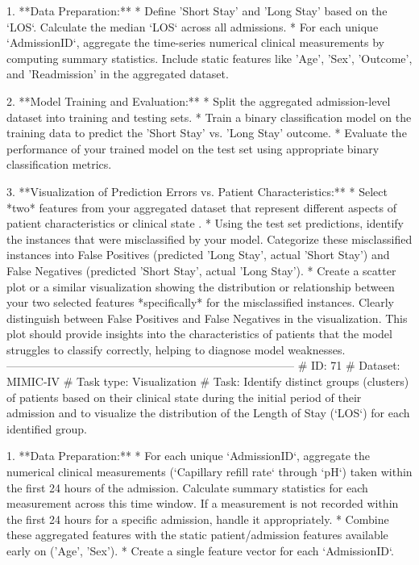 \begin{tcolorbox}[colback=cadmiumgreen!5!white,colframe=forestgreen!75!white,breakable,title=\textit{Generated analytical tasks in task 4.}]
\begin{VerbatimWrap}
 1. **Data Preparation:**
  * Define 'Short Stay' and 'Long Stay' based on the `LOS`. Calculate the median `LOS` across all admissions.
  * For each unique `AdmissionID`, aggregate the time-series numerical clinical measurements by computing summary statistics. Include static features like 'Age', 'Sex', 'Outcome', and 'Readmission' in the aggregated dataset.
 
 2. **Model Training and Evaluation:**
  * Split the aggregated admission-level dataset into training and testing sets.
  * Train a binary classification model on the training data to predict the 'Short Stay' vs. 'Long Stay' outcome.
  * Evaluate the performance of your trained model on the test set using appropriate binary classification metrics.
 
 3. **Visualization of Prediction Errors vs. Patient Characteristics:**
  * Select *two* features from your aggregated dataset that represent different aspects of patient characteristics or clinical state .
  * Using the test set predictions, identify the instances that were misclassified by your model. Categorize these misclassified instances into False Positives (predicted 'Long Stay', actual 'Short Stay') and False Negatives (predicted 'Short Stay', actual 'Long Stay').
  * Create a scatter plot or a similar visualization showing the distribution or relationship between your two selected features *specifically* for the misclassified instances. Clearly distinguish between False Positives and False Negatives in the visualization. This plot should provide insights into the characteristics of patients that the model struggles to classify correctly, helping to diagnose model weaknesses.
-----------------------------------------------------------------------------
# ID: 71  
# Dataset: MIMIC-IV 
# Task type: Visualization
# Task: Identify distinct groups (clusters) of patients based on their clinical state during the initial period of their admission and to visualize the distribution of the Length of Stay (`LOS`) for each identified group.
 
 1. **Data Preparation:**
  * For each unique `AdmissionID`, aggregate the numerical clinical measurements (`Capillary refill rate` through `pH`) taken within the first 24 hours of the admission. Calculate summary statistics for each measurement across this time window. If a measurement is not recorded within the first 24 hours for a specific admission, handle it appropriately.
  * Combine these aggregated features with the static patient/admission features available early on ('Age', 'Sex').
  * Create a single feature vector for each `AdmissionID`.
 

\end{VerbatimWrap}
\end{tcolorbox}
